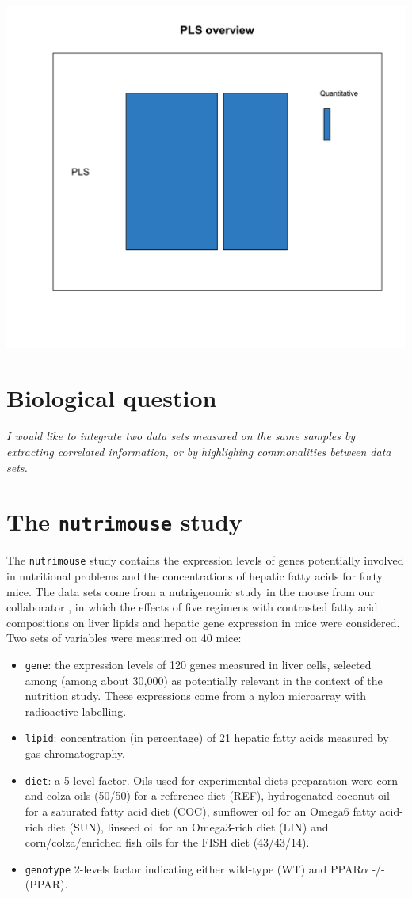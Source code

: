 \documentclass[]{book}
\theoremstyle{definition}
\theoremstyle{definition}
\theoremstyle{definition}
\theoremstyle{remark}
\begin{document}
\begin{center}\includegraphics[width=0.5\linewidth]{Figures/overview-PLS-1} \end{center}

\section{Biological question}\label{biological-question-3}

{ \emph{I would like to integrate two data sets measured on the same
samples by extracting correlated information, or by highlighing
commonalities between data sets.} }

\section{\texorpdfstring{The \texttt{nutrimouse}
study}{The nutrimouse study}}\label{the-nutrimouse-study}

The \texttt{nutrimouse} study contains the expression levels of genes
potentially involved in nutritional problems and the concentrations of
hepatic fatty acids for forty mice. The data sets come from a
nutrigenomic study in the mouse from our collaborator \citep{Mar07}, in
which the effects of five regimens with contrasted fatty acid
compositions on liver lipids and hepatic gene expression in mice were
considered. Two sets of variables were measured on 40 mice:

\begin{itemize}
\item
  \texttt{gene}: the expression levels of 120 genes measured in liver
  cells, selected among (among about 30,000) as potentially relevant in
  the context of the nutrition study. These expressions come from a
  nylon microarray with radioactive labelling.
\item
  \texttt{lipid}: concentration (in percentage) of 21 hepatic fatty
  acids measured by gas chromatography.
\item
  \texttt{diet}: a 5-level factor. Oils used for experimental diets
  preparation were corn and colza oils (50/50) for a reference diet
  (REF), hydrogenated coconut oil for a saturated fatty acid diet (COC),
  sunflower oil for an Omega6 fatty acid-rich diet (SUN), linseed oil
  for an Omega3-rich diet (LIN) and corn/colza/enriched fish oils for
  the FISH diet (43/43/14).
\item
  \texttt{genotype} 2-levels factor indicating either wild-type (WT) and
  PPAR\(\alpha\) -/- (PPAR).
\end{itemize}
\end{document}
